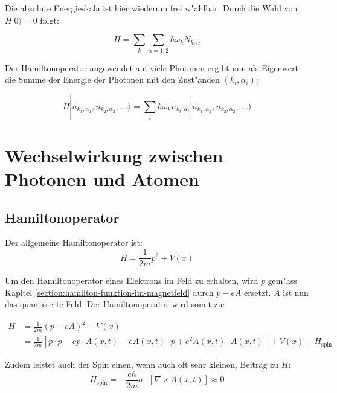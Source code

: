 Die absolute Energieskala ist hier wiederum frei w"ahlbar. Durch die Wahl von $H|0\rangle = 0$ folgt:

\begin{equation*}
H = \sum_k \sum_{\alpha=1,2} \hbar \omega_k N_{k,\alpha}
\end{equation*}

Der Hamiltonoperator angewendet auf viele Photonen ergibt nun als Eigenwert die Summe der Energie der Photonen mit den Zust"anden $(k_i,\alpha_i)$:

\begin{equation*}
H |n_{k_1,\alpha_1}, n_{k_2,\alpha_2}, \, \hdots\rangle = \sum_i \hbar \omega_k n_{k_i,\alpha_i} |n_{k_1,\alpha_1}, n_{k_2,\alpha_2}, \, \hdots\rangle
\end{equation*}

\section{Wechselwirkung zwischen Photonen und Atomen}

\subsection{Hamiltonoperator}

Der allgemeine Hamiltonoperator ist:
\begin{equation*}
H = \frac{1}{2m}p^2 + V(x)
\end{equation*}

Um den Hamiltonoperator eines Elektrons im Feld zu erhalten, wird $p$ gem"ass Kapitel \ref{section:hamilton-funktion-im-magnetfeld} durch $p - eA$ ersetzt. $A$ ist nun das quantisierte Feld. Der Hamiltonoperator wird somit zu:

\begin{equation*}
\begin{split}
H &= \frac{1}{2m}(p - eA)^2 + V(x)\\
 &= \frac{1}{2m}\left[p \cdot p - e p \cdot A(x, t) - e A(x, t) \cdot p + e^2 A(x, t) \cdot A(x, t) \right] + V(x) + H_{\text{spin}}
\end{split}
\end{equation*}

Zudem leistet auch der Spin einen, wenn auch oft sehr kleinen, Beitrag zu $H$:
\begin{equation*}
H_{\text{spin}} = - \frac{e \hbar}{2m}\sigma \cdot \left[\nabla \times A(x, t)\right] \approx 0
\end{equation*}

